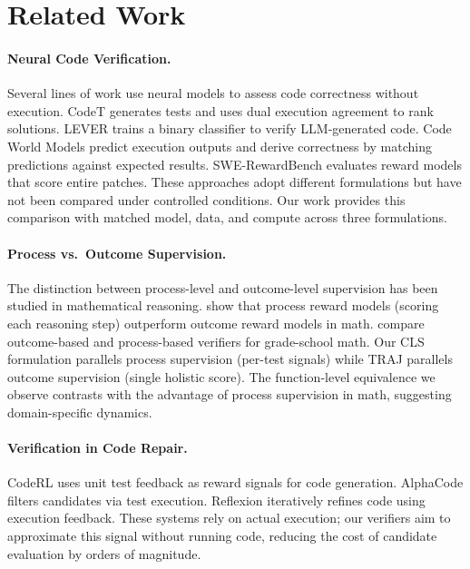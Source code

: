 \documentclass[11pt,a4paper]{article}
\begin{document}
\section{Related Work}

\paragraph{Neural Code Verification.}
Several lines of work use neural models to assess code correctness without execution.
CodeT \citep{chen2023codet} generates tests and uses dual execution agreement to rank solutions.
LEVER \citep{ni2023lever} trains a binary classifier to verify LLM-generated code.
Code World Models \citep{gu2024cwm} predict execution outputs and derive correctness by matching predictions against expected results.
SWE-RewardBench \citep{zhang2024swebench} evaluates reward models that score entire patches.
These approaches adopt different formulations but have not been compared under controlled conditions.
Our work provides this comparison with matched model, data, and compute across three formulations.

\paragraph{Process vs.\ Outcome Supervision.}
The distinction between process-level and outcome-level supervision has been studied in mathematical reasoning.
\citet{lightman2023lets} show that process reward models (scoring each reasoning step) outperform outcome reward models in math.
\citet{uesato2022solving} compare outcome-based and process-based verifiers for grade-school math.
Our CLS formulation parallels process supervision (per-test signals) while TRAJ parallels outcome supervision (single holistic score).
The function-level equivalence we observe contrasts with the advantage of process supervision in math, suggesting domain-specific dynamics.

\paragraph{Verification in Code Repair.}
CodeRL \citep{le2022coderl} uses unit test feedback as reward signals for code generation.
AlphaCode \citep{li2022alphacode} filters candidates via test execution.
Reflexion \citep{shinn2023reflexion} iteratively refines code using execution feedback.
These systems rely on actual execution; our verifiers aim to approximate this signal without running code, reducing the cost of candidate evaluation by orders of magnitude.
\end{document}

